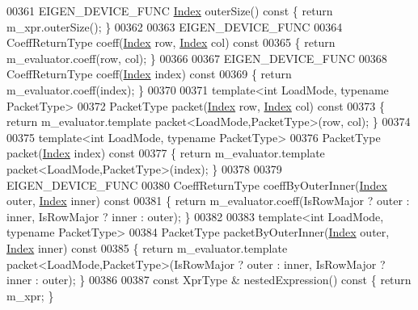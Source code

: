 \begin{DoxyCode}
00361   EIGEN\_DEVICE\_FUNC \hyperlink{namespace_eigen_a62e77e0933482dafde8fe197d9a2cfde}{Index} outerSize()\textcolor{keyword}{ const }\{ \textcolor{keywordflow}{return} m\_xpr.outerSize(); \}
00362 
00363   EIGEN\_DEVICE\_FUNC
00364   CoeffReturnType coeff(\hyperlink{namespace_eigen_a62e77e0933482dafde8fe197d9a2cfde}{Index} row, \hyperlink{namespace_eigen_a62e77e0933482dafde8fe197d9a2cfde}{Index} col)\textcolor{keyword}{ const}
00365 \textcolor{keyword}{  }\{ \textcolor{keywordflow}{return} m\_evaluator.coeff(row, col); \}
00366 
00367   EIGEN\_DEVICE\_FUNC
00368   CoeffReturnType coeff(\hyperlink{namespace_eigen_a62e77e0933482dafde8fe197d9a2cfde}{Index} index)\textcolor{keyword}{ const}
00369 \textcolor{keyword}{  }\{ \textcolor{keywordflow}{return} m\_evaluator.coeff(index); \}
00370 
00371   \textcolor{keyword}{template}<\textcolor{keywordtype}{int} LoadMode, \textcolor{keyword}{typename} PacketType>
00372   PacketType packet(\hyperlink{namespace_eigen_a62e77e0933482dafde8fe197d9a2cfde}{Index} row, \hyperlink{namespace_eigen_a62e77e0933482dafde8fe197d9a2cfde}{Index} col)\textcolor{keyword}{ const}
00373 \textcolor{keyword}{  }\{ \textcolor{keywordflow}{return} m\_evaluator.template packet<LoadMode,PacketType>(row, col); \}
00374 
00375   \textcolor{keyword}{template}<\textcolor{keywordtype}{int} LoadMode, \textcolor{keyword}{typename} PacketType>
00376   PacketType packet(\hyperlink{namespace_eigen_a62e77e0933482dafde8fe197d9a2cfde}{Index} index)\textcolor{keyword}{ const}
00377 \textcolor{keyword}{  }\{ \textcolor{keywordflow}{return} m\_evaluator.template packet<LoadMode,PacketType>(index); \}
00378   
00379   EIGEN\_DEVICE\_FUNC
00380   CoeffReturnType coeffByOuterInner(\hyperlink{namespace_eigen_a62e77e0933482dafde8fe197d9a2cfde}{Index} outer, \hyperlink{namespace_eigen_a62e77e0933482dafde8fe197d9a2cfde}{Index} inner)\textcolor{keyword}{ const}
00381 \textcolor{keyword}{  }\{ \textcolor{keywordflow}{return} m\_evaluator.coeff(IsRowMajor ? outer : inner, IsRowMajor ? inner : outer); \}
00382   
00383   \textcolor{keyword}{template}<\textcolor{keywordtype}{int} LoadMode, \textcolor{keyword}{typename} PacketType>
00384   PacketType packetByOuterInner(\hyperlink{namespace_eigen_a62e77e0933482dafde8fe197d9a2cfde}{Index} outer, \hyperlink{namespace_eigen_a62e77e0933482dafde8fe197d9a2cfde}{Index} inner)\textcolor{keyword}{ const}
00385 \textcolor{keyword}{  }\{ \textcolor{keywordflow}{return} m\_evaluator.template packet<LoadMode,PacketType>(IsRowMajor ? outer : inner, IsRowMajor ? inner 
      : outer); \}
00386   
00387   \textcolor{keyword}{const} XprType & nestedExpression()\textcolor{keyword}{ const }\{ \textcolor{keywordflow}{return} m\_xpr; \}

\end{DoxyCode}
